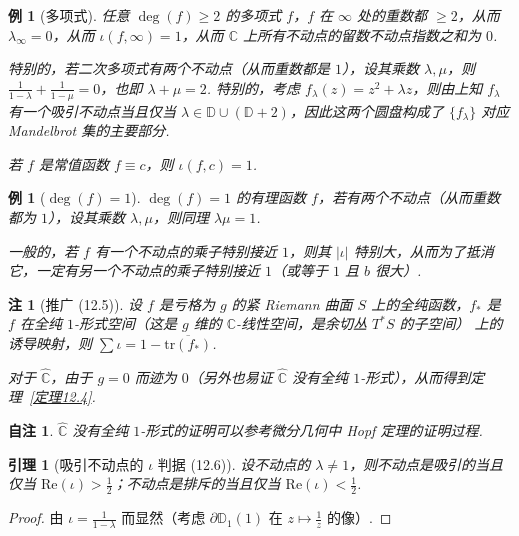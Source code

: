\documentclass[11pt, a4paper, oneside]{ctexart}
\newtheorem{example}[theorem]{例}
\newtheorem{lemma}[theorem]{引理}
\newtheorem{note}[theorem]{自注}
\newtheorem{remark}[theorem]{注}
\newcommand{\C}{\mathbb{C}}
\newcommand{\D}{\mathbb{D}}
\newcommand{\re}{\mathrm{Re}}
\newcommand{\tr}{\mathrm{tr}}
\newcommand{\abs}[1]{\left|{#1}\right|}
\begin{document}
    \begin{example}[多项式]
        任意 $\deg(f)\geq 2$ 的多项式 $f$，$f$ 在 $\infty$ 处的重数都 $\geq 2$，从而 $\lambda_{\infty}=0$，从而 $\iota(f,\infty)=1$，从而 $\C$ 上所有不动点的留数不动点指数之和为 $0$.

        特别的，若二次多项式有两个不动点（从而重数都是 $1$），设其乘数 $\lambda,\mu$，则 $\frac{1}{1-\lambda}+\frac{1}{1-\mu}=0$，也即 $\lambda+\mu=2$. 特别的，考虑 $f_{\lambda}(z)=z^2+\lambda z$，则由上知 $f_{\lambda}$ 有一个吸引不动点当且仅当 $\lambda\in\D\cup(\D+2)$，因此这两个圆盘构成了 $\{f_{\lambda}\}$ 对应 Mandelbrot 集的主要部分.

        若 $f$ 是常值函数 $f\equiv c$，则 $\iota(f,c)=1$.
    \end{example}

    \begin{example}[$\deg(f)=1$]
        $\deg(f)=1$ 的有理函数 $f$，若有两个不动点（从而重数都为 $1$），设其乘数 $\lambda,\mu$，则同理 $\lambda\mu=1$.

        一般的，若 $f$ 有一个不动点的乘子特别接近 $1$，则其 $\abs{\iota}$ 特别大，从而为了抵消它，一定有另一个不动点的乘子特别接近 $1$（或等于 $1$ 且 $b$ 很大）.
    \end{example}

    \begin{remark}[推广 (12.5)]
        设 $f$ 是亏格为 $g$ 的紧 Riemann 曲面 $S$ 上的全纯函数，$f_*$ 是 $f$ 在全纯 $1$-形式空间（这是 $g$ 维的 $\C$-线性空间，是余切丛 $T^*S$ 的子空间） 上的诱导映射，则 $\sum\iota=1-\overline{\tr(f_*)}$.

        对于 $\hat{\C}$，由于 $g=0$ 而迹为 $0$（另外也易证 $\hat{\C}$ 没有全纯 $1$-形式），从而得到定理~\ref{定理12.4}.
    \end{remark}
    \begin{note}
        $\hat{\C}$ 没有全纯 $1$-形式的证明可以参考微分几何中 Hopf 定理的证明过程.
    \end{note}

    \begin{lemma}[吸引不动点的 $\iota$ 判据 (12.6)]\label{引理12.6}
        设不动点的 $\lambda\neq 1$，则不动点是吸引的当且仅当 $\re(\iota)>\frac{1}{2}$；不动点是排斥的当且仅当 $\re(\iota)<\frac{1}{2}$.
    \end{lemma}
    \begin{proof}
        由 $\iota=\frac{1}{1-\lambda}$ 而显然（考虑 $\partial\D_1(1)$ 在 $z\mapsto \frac{1}{z}$ 的像）.
    \end{proof}
\end{document}
